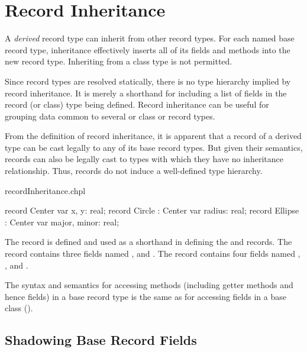 \section{Record Inheritance}
\label{Record_Inheritance}

A \emph{derived} record type can inherit from other record types.  For each named
base record type, inheritance effectively inserts all of its fields and methods
into the new record type.  Inheriting from a class type is not permitted.

Since record types are resolved statically, there is no type hierarchy implied
by record inheritance.  It is merely a shorthand for including a list of fields
in the record (or class) type being defined.  Record inheritance can be useful
for grouping data common to several or class or record types.

From the definition of record inheritance, it is apparent that a record of a
derived type can be cast legally to any of its base record types.  But given
their semantics, records can also be legally cast to types with which they have
no inheritance relationship.  Thus, records do not induce a well-defined type
hierarchy.

\begin{chapelexample}{recordInheritance.chpl}
\begin{chapel}
record Center { var x, y: real; }
record Circle : Center {
  var radius: real;
}
record Ellipse : Center {
  var major, minor: real;
}
\end{chapel}
\begin{chapeloutput}
\end{chapeloutput}
The record  is defined and used as a shorthand in defining
the  and  records.  The  record contains
three  fields named ,  and .  The
 record contains four  fields named , ,
 and .
\end{chapelexample}

The syntax and semantics for accessing methods (including getter methods and
hence fields) in a base
record type is the same as for accessing fields in a base class ().

\subsection{Shadowing Base Record Fields}
\label{Shadowing_Base_Record_Fields}

